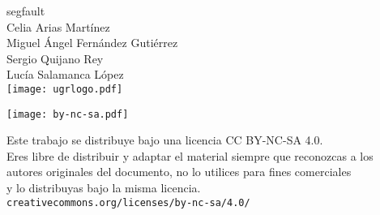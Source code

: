 \documentclass[10pt, a4paper]{article}
\theoremstyle{theorem-style}
\theoremstyle{theorem-style}
\theoremstyle{definition-style}
\theoremstyle{remark-style}
\theoremstyle{example-style}
\theoremstyle{definition-style}
\theoremstyle{remark-style}
\newcommand{\autor}{Celia Arias Martínez\\Miguel Ángel Fernández Gutiérrez\\Sergio Quijano Rey\\Lucía Salamanca López}
\newcommand{\grado}{segfault}
\begin{document}

\afterpage{\restorepagecolor} %
\begin{titlepage}

	\parbox[t]{\textwidth}{
			\raggedright %
			\fontsize{40pt}{40pt}\selectfont\sffamily{}
	}

	\vfill

	\parbox[t]{\textwidth}{
		\raggedright %
		\sffamily\large\color{white}
		\grado\\
		{\Large \autor }\\[15pt]
		\texttt{[image: ugrlogo.pdf]}
	}

\end{titlepage}


\thispagestyle{empty}
\null
\vfill

\parbox[t]{\textwidth}{
  \texttt{[image: by-nc-sa.pdf]}\\[4pt]
  \raggedright %
  \sffamily\large
  {\Large Este trabajo se distribuye bajo una licencia CC BY-NC-SA 4.0.}\\[4pt]
  Eres libre de distribuir y adaptar el material siempre que reconozcas a los\\
  autores originales del documento, no lo utilices para fines comerciales\\
  y lo distribuyas bajo la misma licencia.\\[4pt]
  \texttt{creativecommons.org/licenses/by-nc-sa/4.0/}
}

\end{document}

